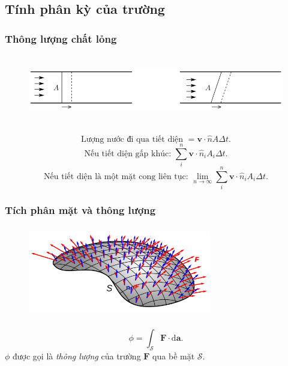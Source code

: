 \subsection{Tính phân kỳ của trường}
\begin{frame}
    \frametitle{Thông lượng chất lỏng}
    \begin{figure}
        \centering
        \includegraphics[width=14cm, height=3cm]{Content/Figure/flux of water.png}
    \end{figure}
    \[\text{Lượng nước đi qua tiết diện~}=\mathbf{v}\cdot\hat{n}A\Delta t.\]
    \[\text{Nếu tiết diện gấp khúc: }\sum_{i}^{n}\mathbf{v}\cdot \hat{n}_i A_i \Delta t.\]
    \vspace{-9pt}
    \[\text{Nếu tiết diện là một mặt cong liên tục: } \lim_{n\to\infty}\sum_{i}^{n}\mathbf{v}\cdot\hat{n}_i A_i \Delta t.\]
\end{frame}
\begin{frame}
    \frametitle{Tích phân mặt và thông lượng}
    \begin{figure}
        \centering
        \includegraphics[width=8cm, height=4cm]{Content/Figure/curve_surface.png}
    \end{figure}
    \[\phi=\int_{\mathcal{S}}\mathbf{F}\cdot\text{d}\mathbf{a}.\]
    \(\phi\) được gọi là \emph{thông lượng} của trường \(\mathbf{F}\) qua bề mặt \(\mathcal{S}\).
\end{frame}
